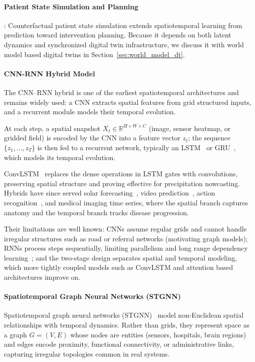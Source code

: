 \documentclass[journal]{IEEEtran}
\begin{document}
\paragraph{Patient State Simulation and Planning}: Counterfactual patient state simulation extends spatiotemporal learning from prediction toward intervention planning. Because it depends on both latent dynamics and synchronized digital twin infrastructure, we discuss it with world model based digital twins in Section~\ref{sec:world_model_dt}.

\paragraph{CNN-RNN Hybrid Model}
The CNN--RNN hybrid is one of the earliest spatiotemporal architectures and remains widely used: a CNN extracts spatial features from grid structured inputs, and a recurrent module models their temporal evolution.
 
At each step, a spatial snapshot $X_t \in \mathbb{R}^{H \times W \times C}$ (image, sensor heatmap, or gridded field) is encoded by the CNN into a feature vector $z_t$; the sequence $\{z_1,\ldots,z_T\}$ is then fed to a recurrent network, typically an LSTM~\cite{rnn_lstm} or GRU~\cite{cho2014gru}, which models its temporal evolution.
 
ConvLSTM~\cite{shi2015convolutional} replaces the dense operations in LSTM gates with convolutions, preserving spatial structure and proving effective for precipitation nowcasting. Hybrids have since served solar forecasting~\cite{li2025solar}, video prediction~\cite{srivastava2015unsupervised}, action recognition~\cite{donahue2015longterm}, and medical imaging time series, where the spatial branch captures anatomy and the temporal branch tracks disease progression.
 
Their limitations are well known: CNNs assume regular grids and cannot handle irregular structures such as road or referral networks (motivating graph models); RNNs process steps sequentially, limiting parallelism and long range dependency learning~\cite{bengio1994learning}; and the two-stage design separates spatial and temporal modeling, which more tightly coupled models such as ConvLSTM and attention based architectures improve on.
 
\paragraph{Spatiotemporal Graph Neural Networks (STGNN)}
Spatiotemporal graph neural networks (STGNN)~\cite{shao2022longterm} model non-Euclidean spatial relationships with temporal dynamics. Rather than grids, they represent space as a graph $G=(V,E)$ whose nodes are entities (sensors, hospitals, brain regions) and edges encode proximity, functional connectivity, or administrative links, capturing irregular topologies common in real systems.
 
\end{document}
